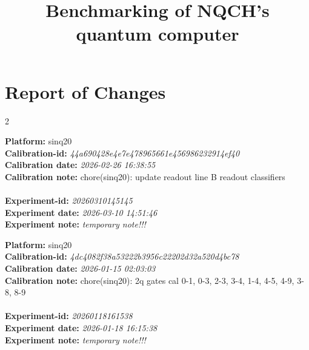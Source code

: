 \documentclass[9pt,a4paper]{src/templates/tau-class/tau}
\title{Benchmarking of NQCH's quantum computer}
\author{\authordate}       %
\begin{document}
\maketitle
\thispagestyle{firststyle}

\section{Report of Changes}


\begin{multicols}{2}

\begin{center}
\begin{tauenvmine}
{\textbf{Platform:}  sinq20 } \\
\textbf{Calibration-id:} \emph{ 44a690428e4e7e478965661e456986232914ef40 } \\
\textbf{Calibration date:} \emph{ 2026-02-26 16:38:55 } \\
\textbf{Calibration note:} chore(sinq20): update readout line B readout classifiers
 \\
\: \\
\textbf{Experiment-id:} \emph{ 20260310145145 } \\
\textbf{Experiment date:} \emph{ 2026-03-10 14:51:46 } \\
\textbf{Experiment note:} \emph{ temporary note!!! } \\


\end{tauenvmine}
\end{center}

\columnbreak

\begin{center}
\begin{tauenvmine}
{\textbf{Platform:}  sinq20 } \\
\textbf{Calibration-id:} \emph{ 4dc4082f38a53222b3956c22202d32a520d4bc78 } \\
\textbf{Calibration date:} \emph{ 2026-01-15 02:03:03 } \\
\textbf{Calibration note:} chore(sinq20): 2q gates cal 0-1, 0-3, 2-3, 3-4, 1-4, 4-5, 4-9, 3-8, 8-9
 \\
\: \\
\textbf{Experiment-id:} \emph{ 20260118161538 } \\
\textbf{Experiment date:} \emph{ 2026-01-18 16:15:38 } \\
\textbf{Experiment note:} \emph{ temporary note!!! } \\
\end{tauenvmine}
\end{center}

\end{multicols}
\end{document}
